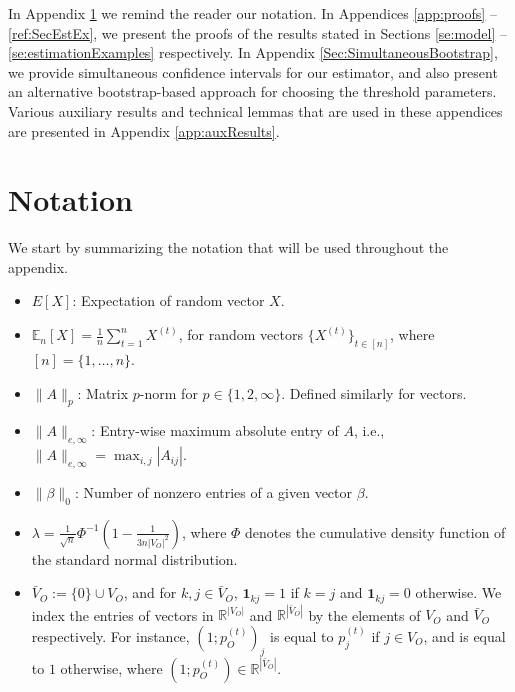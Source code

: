 \documentclass[opre,nonblindrev]{informs3} %
\begin{document}
\newpage
    \begin{APPENDIX}{}
\noindent In Appendix \ref{app:notation}
    	we remind the reader our notation.
    	In Appendices
    	\ref{app:proofs} -- \ref{ref:SecEstEx},
    	we present the proofs of the results stated in Sections \ref{se:model} -- \ref{se:estimationExamples} respectively. In Appendix
    	\ref{Sec:SimultaneousBootstrap}, we provide
    	simultaneous confidence intervals for our estimator, and also present an alternative bootstrap-based approach for choosing the threshold parameters.
    	Various auxiliary results and technical lemmas that are used in these appendices are presented in Appendix \ref{app:auxResults}.
    	
    	\section{Notation} \label{app:notation}
    	We start by 
    	summarizing 
 the notation that will be used throughout the appendix.
    	\begin{itemize}
    		\item $E[X]$: Expectation of random vector $X$.
    		\item $\mathbb{E}_n[X] = \frac{1}{n} \sum_{t=1}^n X^{(t)}$, for random vectors $\{X^{(t)}\}_{t\in[n]}$, where $[n]=\{1,\dots,n\}$.
    		\item $\|A \|_p$: Matrix $p$-norm for $p\in \{1,2,\infty\}$. Defined similarly for vectors.
    		\item $\|A\|_{e,\infty}$: Entry-wise maximum absolute entry of $A$, i.e., $\|A\|_{e,\infty}=\max_{i,j} |A_{ij}|$.
    		\item 
    		$\| \beta \|_0$:  Number of nonzero entries of a given vector $\beta$.
    		\item $\lambda = \frac{1}{\sqrt{n}}  \Phi^{-1}\left(1-\frac{1}{3n|V_O|^2}\right)$, where $\Phi$
    		denotes the cumulative density function of the standard normal distribution.
    		
    		\item 	 $\bar V_O := \{0 \} \cup V_O$, and for $k,j\in \bar{V}_O$,
    		$\mathbf{1}_{kj}=1$ if $k=j$ and $\mathbf{1}_{kj}=0$ otherwise.
    		We index the entries of vectors in $\mathbb{R}^{|V_O|}$ and
    		$\mathbb{R}^{|\bar{V}_O|}$ by the elements of $V_O$ and $\bar{V}_O$ respectively.
    		For instance,
    		$(1;p_O^{(t)})_j$ is equal to
    		$p_j^{(t)}$ if $j\in V_O$, and is equal to $1$ otherwise, where $(1;p_O^{(t)}) \in \mathbb{R}^{|\bar{V}_O|}$.
    		

\end{itemize}
\end{APPENDIX}
\end{document}
